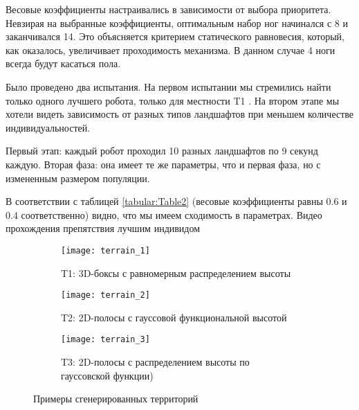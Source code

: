 Весовые коэффициенты настраивались в зависимости от выбора приоритета. Невзирая на выбранные коэффициенты, оптимальным набор ног начинался с 8 и заканчивался 14. Это объясняется критерием статического равновесия, который, как оказалось, увеличивает проходимость механизма. В данном случае 4 ноги всегда будут касаться пола. 

Было проведено два испытания. На первом испытании мы стремились найти только одного лучшего робота, только для местности T1 . На втором этапе мы хотели видеть зависимость от разных типов ландшафтов при меньшем количестве индивидуальностей.

Первый этап: каждый робот проходил 10 разных ландшафтов по 9 секунд каждую. Вторая фаза: она имеет те же параметры, что и первая фаза, но с измененным размером популяции. 

В соответствии с таблицей \ref{tabular:Table2} (весовые коэффициенты равны 0.6 и 0.4 соответственно) видно, что мы имеем сходимость в параметрах. Видео прохождения препятствия лучшим индивидом \quad
{}

\begin{figure}[h]
    \begin{subfigure}{0.33\textwidth}
    \centering\texttt{[image: terrain\_1]} 
    \caption{T1: 3D-боксы с равномерным распределением высоты}
    \label{fig:terrain_1}
    \end{subfigure}
    \begin{subfigure}{0.33\textwidth}
    \centering\texttt{[image: terrain\_2]} 
    \caption{T2: 2D-полосы с гауссовой функциональной высотой}
    \label{fig:terrain_2}
    \end{subfigure}
    \begin{subfigure}{0.33\textwidth}
    \centering\texttt{[image: terrain\_3]}
    \caption{T3: 2D-полосы с распределением высоты по гауссовской функции)}
    \label{fig:terrain_3}
    \end{subfigure}
     
    \caption{Примеры сгенерированных территорий}
    \label{fig:terrains}
\end{figure}
\vspace{-0.5cm}

